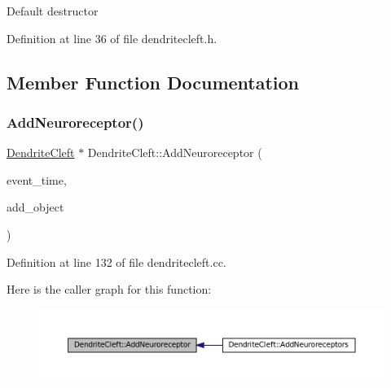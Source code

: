 Default destructor 

Definition at line 36 of file dendritecleft.\+h.



\subsection{Member Function Documentation}
\mbox{\label{class_dendrite_cleft_a65901c5659ca5eac161a26f15e0f437b}} 
\subsubsection{\texorpdfstring{Add\+Neuroreceptor()}{AddNeuroreceptor()}}
{\footnotesize\ttfamily \mbox{\hyperlink{class_dendrite_cleft}{Dendrite\+Cleft}} $\ast$ Dendrite\+Cleft\+::\+Add\+Neuroreceptor (\begin{DoxyParamCaption}\item[{std\+::chrono\+::time\+\_\+point$<$ \mbox{\hyperlink{universe_8h_a0ef8d951d1ca5ab3cfaf7ab4c7a6fd80}{Clock}} $>$}]{event\+\_\+time,  }\item[{\mbox{\hyperlink{class_dendrite_cleft}{Dendrite\+Cleft}} $\ast$}]{add\+\_\+object }\end{DoxyParamCaption})}



Definition at line 132 of file dendritecleft.\+cc.

Here is the caller graph for this function\+:\nopagebreak
\begin{figure}[H]
\begin{center}
\leavevmode
\includegraphics[width=350pt]{class_dendrite_cleft_a65901c5659ca5eac161a26f15e0f437b_icgraph}
\end{center}
\end{figure}
\mbox{\label{class_dendrite_cleft_a6d29f577ff12366f8f51804b13468395}} 

